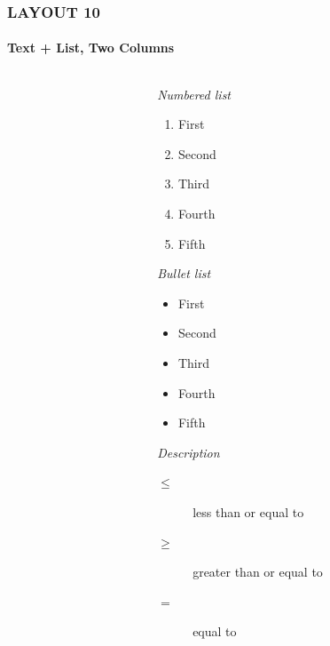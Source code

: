 \documentclass[14 pt]{beamer}
\begin{document}
\begin{frame}[t]
\frametitle{LAYOUT 10}
\framesubtitle{Text + List, Two Columns}

\begin{columns}[t]
  \begin{column}{0.45\textwidth}
    \lipsum[7]
    \vskip0.5cm%
    \lipsum[8]
  \end{column}

\begin{column}{0.45\textwidth}
  \emph{Numbered list}

  \begin{enumerate}
    \item First
    \item Second
    \item Third
    \item Fourth
    \item Fifth
  \end{enumerate}

  \vskip0.5cm%

  \emph{Bullet list}

  \begin{itemize}
    \item First
    \item Second
    \item Third
    \item Fourth
    \item Fifth
  \end{itemize}

  \vskip0.5cm%

  \emph{Description}

  \begin{description}
    \item [$\leq$] less than or equal to
    \item [$\geq$] greater than or equal to
    \item [$=$] equal to
  \end{description}

\end{column}

\end{columns}
\end{frame}


%
%

\end{document}
